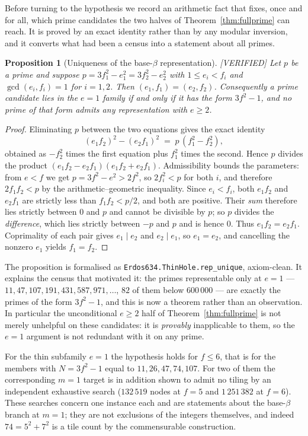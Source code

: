 \documentclass[11pt,reqno]{amsart}
\theoremstyle{plain}
\newtheorem{proposition}[theorem]{Proposition}
\theoremstyle{definition}
\newcommand{\lab}[1]{\hfill\textnormal{\footnotesize\textsc{[#1]}}}
\begin{document}
Before turning to the hypothesis we record an arithmetic fact that fixes, once and for all, which
prime candidates the two halves of Theorem~\ref{thm:fullprime} can reach. It is proved by an exact
identity rather than by any modular inversion, and it converts what had been a census into a
statement about all primes.

\begin{proposition}[Uniqueness of the base-$\beta$ representation]\label{prop:repunique}\lab{VERIFIED}
Let $p$ be a prime and suppose $p=3f_1^2-e_1^2=3f_2^2-e_2^2$ with $1\le e_i<f_i$ and
$\gcd(e_i,f_i)=1$ for $i=1,2$. Then $(e_1,f_1)=(e_2,f_2)$. Consequently a prime candidate lies in
the $e=1$ family if and only if it has the form $3f^2-1$, and no prime of that form admits any
representation with $e\ge2$.
\end{proposition}

\begin{proof}
Eliminating $p$ between the two equations gives the exact identity
\[
  (e_1f_2)^2-(e_2f_1)^2 \;=\; p\,(f_1^2-f_2^2),
\]
obtained as $-f_2^2$ times the first equation plus $f_1^2$ times the second. Hence $p$ divides the
product $(e_1f_2-e_2f_1)(e_1f_2+e_2f_1)$. Admissibility bounds the parameters: from $e<f$ we get
$p=3f^2-e^2>2f^2$, so $2f_i^2<p$ for both $i$, and therefore $2f_1f_2<p$ by the arithmetic--geometric
inequality. Since $e_i<f_i$, both $e_1f_2$ and $e_2f_1$ are strictly less than $f_1f_2<p/2$, and both
are positive. Their \emph{sum} therefore lies strictly between $0$ and $p$ and cannot be divisible by
$p$; so $p$ divides the \emph{difference}, which lies strictly between $-p$ and $p$ and is hence $0$.
Thus $e_1f_2=e_2f_1$. Coprimality of each pair gives $e_1\mid e_2$ and $e_2\mid e_1$, so $e_1=e_2$,
and cancelling the nonzero $e_1$ yields $f_1=f_2$.
\end{proof}

The proposition is formalised as \texttt{Erdos634.ThinHole.rep\_unique}, axiom-clean. It explains the
census that motivated it: the primes representable only at $e=1$ --- $11,47,107,191,431,587,971,\dots$,
$82$ of them below $600\,000$ --- are exactly the primes of the form $3f^2-1$, and this is now a
theorem rather than an observation. In particular the unconditional $e\ge2$ half of
Theorem~\ref{thm:fullprime} is not merely unhelpful on these candidates: it is \emph{provably}
inapplicable to them, so the $e=1$ argument is not redundant with it on any prime.

For the thin subfamily $e=1$ the hypothesis holds for $f\le6$, that is for the members with
$N=3f^2-1$ equal to $11,26,47,74,107$. For two of them the corresponding $m=1$ target is in
addition shown to admit no tiling by an independent exhaustive search ($132\,519$ nodes at
$f=5$ and $1\,251\,382$ at $f=6$). These searches concern one instance each and are statements
about the base-$\beta$ branch at $m=1$; they are not exclusions of the integers themselves, and
indeed $74=5^2+7^2$ is a tile count by the commensurable construction.
\end{document}
